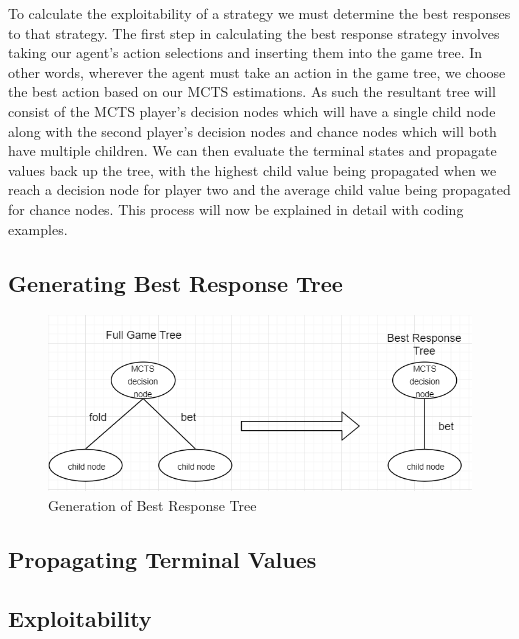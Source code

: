 To calculate the exploitability of a strategy we must determine the best responses
to that strategy.
The first step in calculating the best response strategy involves
taking our agent's action selections and inserting them into the game tree\citep{heinrich2017reinforcement}.
In other words, wherever the agent must take an action in the game tree, we choose the best action
based on our MCTS estimations.
As such the resultant tree will consist of the MCTS player's decision nodes which will have
a single child node along with the second player's decision nodes and chance nodes
which will both have multiple children.
We can then evaluate the terminal states and propagate values back up the tree, with the highest
child value being propagated when we reach a decision node for player two and the average child
value being propagated for chance nodes.
This process will now be explained in detail with coding examples.

\subsection{Generating Best Response Tree}\label{subsec:applyMCTS}

\begin{figure}[ht]
    \includegraphics[scale=1]{images/best_response_tree_vs_full_tree.PNG}
    \caption{Generation of Best Response Tree}
\end{figure}

\subsection{Propagating Terminal Values}\label{subsec:propagateTerminals}
\subsection{Exploitability}\label{subsec:exploitability}

